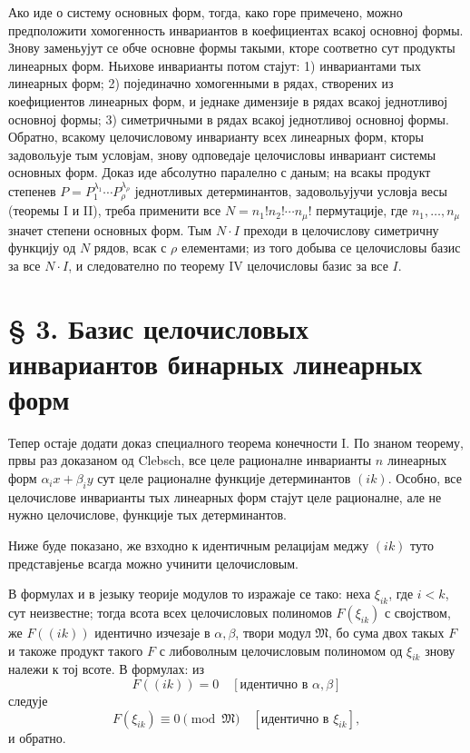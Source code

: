 ﻿\documentclass[11pt]{article}
\providecommand{\frM}{\mathfrak M}
\begin{document}
Ако иде о систему основных форм, тогда, како горе примечено, можно предположити хомогенность инвариантов в коефициентах всакој основној формы. Знову заменьујут се обче основне формы такыми, кторе соответно сут продукты линеарных форм. Ньихове инварианты потом стајут: 1) инвариантами тых линеарных форм; 2) појединачно хомогенными в рядах, створених из коефициентов линеарных форм, и једнаке димензије в рядах всакој једнотливој основној формы; 3) симетричными в рядах всакој једнотливој основној формы. Обратно, всакому целочисловому инварианту всех линеарных форм, кторы задовольује тым условјам, знову одповедаје целочисловы инвариант системы основных форм. Доказ иде абсолутно паралелно с даным; на всакы продукт степенев \(P=P_1^{\lambda_1}\cdots P_\rho^{\lambda_\rho}\) једнотливых детерминантов, задовольујучи условја весы (теоремы I и II), треба применити все \(N=n_1!n_2!\cdots n_\mu!\) пермутације, где \(n_1,\ldots,n_\mu\) значет степени основных форм. Тым \(N\cdot I\) преходи в целочислову симетричну функцију од \(N\) рядов, всак с \(\rho\) елементами; из того добыва се целочисловы базис за все \(N\cdot I\), и следователно по теорему IV целочисловы базис за все \(I\).

\setcounter{equation}{0}
\section*{§ 3. Базис целочисловых инвариантов бинарных линеарных форм}

Тепер остаје додати доказ специалного теорема конечности I. По знаном теорему, првы раз доказаном од Clebsch, все целе рационалне инварианты \(n\) линеарных форм \(\alpha_i x+\beta_i y\) сут целе рационалне функције детерминантов \((ik)\). Особно, все целочислове инварианты тых линеарных форм стајут целе рационалне, але не нужно целочислове, функције тых детерминантов.

Ниже буде показано, же взходно к идентичным релацијам меджу \((ik)\) туто представјенье всагда можно учинити целочисловым.

В формулах и в језыку теорије модулов то изражаје се тако: неха \(\xi_{ik}\), где \(i<k\), сут неизвестне; тогда всота всех целочисловых полиномов \(F(\xi_{ik})\) с својством, же \(F((ik))\) идентично изчезаје в \(\alpha,\beta\), твори модул \(\frM\), бо сума двох такых \(F\) и такоже продукт такого \(F\) с либоволным целочисловым полиномом од \(\xi_{ik}\) знову належи к тој всоте. В формулах: из
\[
        F((ik))=0\quad [\text{идентично в \(\alpha,\beta\)}]
\]
следује
\[
        F(\xi_{ik})\equiv0\pmod{\frM}\quad [\text{идентично в \(\xi_{ik}\)}],
\]
и обратно.
\end{document}
